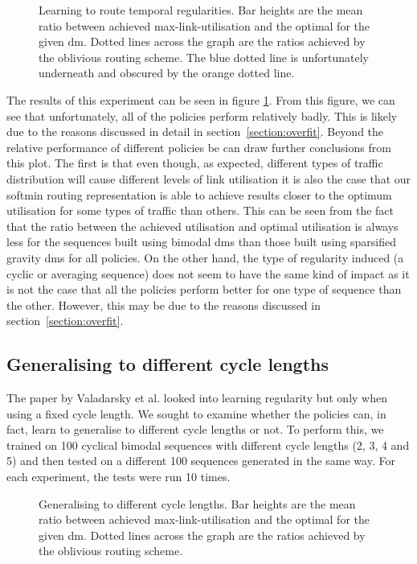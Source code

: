\begin{figure}
    \centering
    
    \caption{Learning to route temporal regularities. Bar heights are the mean ratio between achieved max-link-utilisation and the optimal for the given \ac{dm}. Dotted lines across the graph are the ratios achieved by the oblivious routing scheme. The blue dotted line is unfortunately underneath and obscured by the orange dotted line.}
    \label{fig:exp_cyclic}
\end{figure}

The results of this experiment can be seen in figure \ref{fig:exp_cyclic}. From this figure, we can see that unfortunately, all of the policies perform relatively badly. This is likely due to the reasons discussed in detail in section~\ref{section:overfit}. Beyond the relative performance of different policies be can draw further conclusions from this plot. The first is that even though, as expected, different types of traffic distribution will cause different levels of link utilisation it is also the case that our softmin routing representation is able to achieve results closer to the optimum utilisation for some types of traffic than others. This can be seen from the fact that the ratio between the achieved utilisation and optimal utilisation is always less for the sequences built using bimodal \acp{dm} than those built using sparsified gravity \acp{dm} for all policies. On the other hand, the type of regularity induced (a cyclic or averaging sequence) does not seem to have the same kind of impact as it is not the case that all the policies perform better for one type of sequence than the other. However, this may be due to the reasons discussed in section~\ref{section:overfit}.

\subsection{Generalising to different cycle lengths}
The paper by Valadarsky et al. looked into learning regularity but only when using a fixed cycle length. We sought to examine whether the policies can, in fact, learn to generalise to different cycle lengths or not. To perform this, we trained on 100 cyclical bimodal sequences with different cycle lengths (2, 3, 4 and 5) and then tested on a different 100 sequences generated in the same way. For each experiment, the tests were run 10 times.

\begin{figure}
    \centering
    
    \caption{Generalising to different cycle lengths. Bar heights are the mean ratio between achieved max-link-utilisation and the optimal for the given \ac{dm}. Dotted lines across the graph are the ratios achieved by the oblivious routing scheme.}
    \label{fig:exp_vary}
\end{figure}

